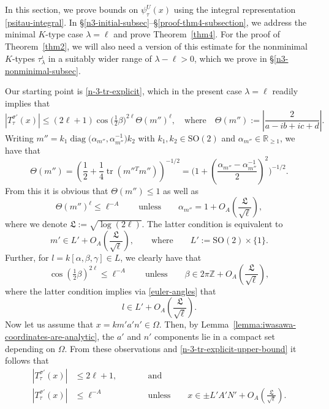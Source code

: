 \documentclass[11pt,oneside]{amsart}
\numberwithin{equation}{section}
\theoremstyle{remark}
\theoremstyle{plain}
\DeclareMathOperator{\diag}{diag}
\DeclareMathOperator{\tr}{tr}
\newcommand\SO{\mathrm{SO}}
\newcommand\ZZ{\mathbb{Z}}
\newcommand\RR{\mathbb{R}}
\renewcommand\leq{\leqslant}
\renewcommand\geq{\geqslant}
\begin{document}
In this section, we prove bounds on $\psi_{\tau}^U(x)$ using the integral representation \eqref{psitau-integral}. In \S\ref{n3-initial-subsec}--\S\ref{proof-thm4-subsection}, we address the minimal $K$-type case $\lambda=\ell$ and prove Theorem~\ref{thm4}. For the proof of Theorem~\ref{thm2}, we will also need a version of this estimate for the nonminimal $K$-types $\tau_{\lambda}^{\iota}$ in a suitably wider range of $\lambda-\ell>0$, which we prove in \S\ref{n3-nonminimal-subsec}.

Our starting point is \eqref{n-3-tr-explicit}, which in the present case $\lambda=\ell$ readily implies that
\begin{equation}
\label{n-3-tr-explicit-upper-bound}
|T_{\tau}^{\sigma'}(x)|\leq (2\ell+1)\cos\big(\tfrac12\beta\big)^{2\ell}\Theta(m'')^{\ell},\quad \text{where}\quad \Theta(m''):=\left|\frac{2}{a-ib+ic+d}\right|.
\end{equation}
Writing $m''=k_1 \diag\big(\alpha_{m''},\alpha_{m''}^{-1}\big)k_2$ with $k_1,k_2\in\SO(2)$ and $\alpha_{m''}\in\RR_{\geq 1}$, we have that
\[ \Theta(m'')=\left(\frac12+\frac14\tr\left(m''{}^Tm''\right)\right)^{-1/2}
=\Bigg(1+\left(\frac{\alpha_{m''}-\alpha_{m''}^{-1}}2\right)^2\Bigg)^{-1/2}. \]
From this it is obvious that $\Theta(m'') \leq 1$ as well as
\[ \Theta(m'')^{\ell}\leq\ell^{-A}\qquad\text{unless}\qquad \alpha_{m''}= 1+O_{A}\left(\frac{\mathfrak{L}}{\sqrt{\ell}}\right), \]
where we denote $\mathfrak{L}:=\sqrt{\log(2\ell)}$. The latter condition is equivalent to
\[
m'\in L'+O_{A}\left(\frac{\mathfrak{L}}{\sqrt{\ell}}\right),\qquad \text{where} \qquad L':=\SO(2)\times\{1\}.
\]
Further, for $l=k[\alpha,\beta,\gamma]\in L$, we clearly have that
\[ \cos\left(\tfrac12\beta\right)^{2\ell}\leq\ell^{-A}\qquad\text{unless}\qquad \beta\in2\pi\ZZ+O_{A}\left(\frac{\mathfrak{L}}{\sqrt{\ell}}\right), \]
where the latter condition implies via \eqref{euler-angles} that
\[ l\in L' +O_{A}\left(\frac{\mathfrak{L}}{\sqrt{\ell}}\right). \]
Now let us assume that $x=km'a'n'\in \Omega$. Then, by Lemma~\ref{lemma:iwasawa-coordinates-are-analytic}, the $a'$ and $n'$ components lie in a compact set depending on $\Omega$. From these observations
and \eqref{n-3-tr-explicit-upper-bound} it follows that
\begin{equation}
\label{n3-essential-support-conditions}
\begin{alignedat}{2}
|T_\tau^{\sigma'}(x)|&\leq 2\ell+1,& &\text{and} \\
|T_\tau^{\sigma'}(x)|&\leq \ell^{-A}& \qquad &\text{unless}\qquad x\in \pm L'A'N'+O_{A}\left(\frac{\mathfrak{L}}{\sqrt{\ell}}\right).
\end{alignedat}
\end{equation}
\end{document}
